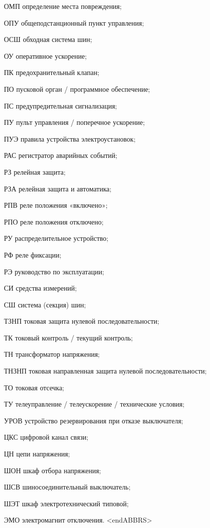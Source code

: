 \begin{list}{}
\item[ОМП] определение места повреждения;
\item[ОПУ] общеподстанционный пункт управления;
\item[ОСШ] обходная система шин;
\item[ОУ] оперативное ускорение;
\item[ПК] предохранительный клапан;
\item[ПО] пусковой орган / программное обеспечение;
\item[ПС] предупредительная сигнализация;
\item[ПУ] пульт управления / поперечное ускорение;
\item[ПУЭ] правила устройства электроустановок;
\item[РАС] регистратор аварийных событий;
\item[РЗ] релейная защита;
\item[РЗА] релейная защита и автоматика;
\item[РПВ] реле положения «включено»;
\item[РПО] реле положения отключено;
\item[РУ] распределительное устройство;
\item[РФ] реле фиксации;
\item[РЭ] руководство по эксплуатации;
\item[СИ] средства измерений;
\item[СШ] система (секция) шин;
\item[ТЗНП] токовая защита нулевой последовательности;
\item[ТК] токовый контроль / текущий контроль;
\item[ТН] трансформатор напряжения;
\item[ТНЗНП] токовая направленная защита нулевой последовательности;
\item[ТО] токовая отсечка;
\item[ТУ] телеуправление / телеускорение / технические условия;
\item[УРОВ] устройство резервирования при отказе выключателя;
\item[ЦКС] цифровой канал связи;
\item[ЦН] цепи напряжения;
\item[ШОН] шкаф отбора напряжения;
\item[ШСВ] шиносоединительный выключатель;
\item[ШЭТ] шкаф электротехнический типовой;
\item[ЭМО] электромагнит отключения.
{\color{white}\fontsize{0.1pt}{0.1pt}\selectfont<endABBRS>}
\end{list}
